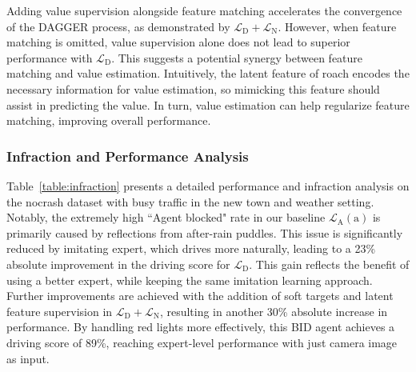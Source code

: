 %
Adding value supervision alongside feature matching accelerates the convergence of the DAGGER process, as demonstrated by $\mathcal{L}_\text{D} + \mathcal{L}_\text{N}$.
However, when feature matching is omitted, value supervision alone does not lead to superior performance with $\mathcal{L}_\text{D}$.
This suggests a potential synergy between feature matching and value estimation. 
Intuitively, the latent feature of roach encodes the necessary information for value estimation, so mimicking this feature should assist in predicting the value. 
In turn, value estimation can help regularize feature matching, improving overall performance.


\subsubsection{Infraction and Performance Analysis}


\hspace{1pc}Table~\ref{table:infraction} presents a detailed performance and infraction analysis on the nocrash dataset with busy traffic in the new town and weather setting. 
Notably, the extremely high ``Agent blocked" rate in our baseline $\mathcal{L}_\text{A}(\text{a})$ is primarily caused by reflections from after-rain puddles. 
This issue is significantly reduced by imitating expert, which drives more naturally, leading to a 23\% absolute improvement in the driving score for $\mathcal{L}_\text{D}$. 
This gain reflects the benefit of using a better expert, while keeping the same imitation learning approach. 
Further improvements are achieved with the addition of soft targets and latent feature supervision in $\mathcal{L}_\text{D}+\mathcal{L}_\text{N}$, resulting in another 30\% absolute increase in performance. 
By handling red lights more effectively, this BID agent achieves a driving score of 89\%, reaching expert-level performance with just camera image as input.





 